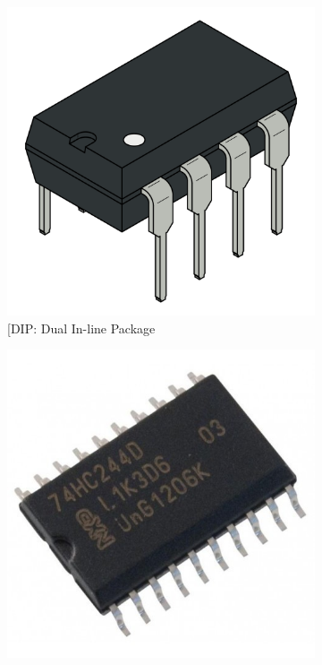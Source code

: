 \documentclass[
]{book}
\begin{document}
\begin{figure}[h]
\centering
  \begin{subfigure}[b]{0.2\textwidth}
    \includegraphics[width=\textwidth]{immagini/30.png}
    \caption{[DIP: Dual In-line Package}
  \end{subfigure}
  \hspace{0.02\textwidth}
  \begin{subfigure}[b]{0.2\textwidth}
    \includegraphics[width=\textwidth]{immagini/31.jpg}

\end{subfigure}
\end{figure}
\end{document}
